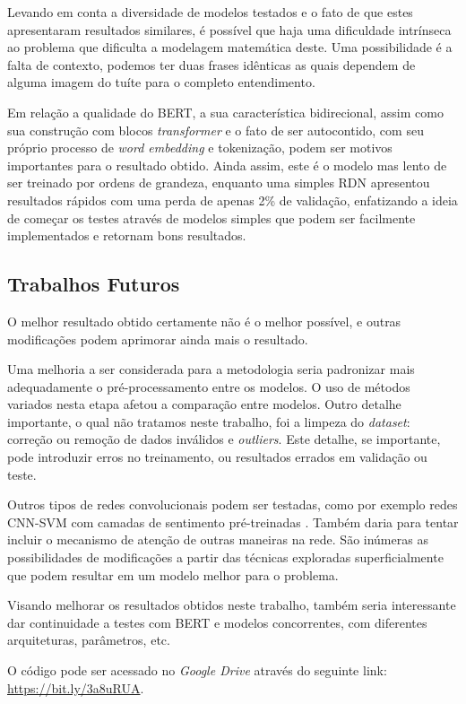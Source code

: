 \documentclass[twoside,conference,a4paper]{IEEEtran}
\begin{document}
Levando em conta a diversidade de modelos testados e o fato de que estes apresentaram resultados similares, é possível que haja uma dificuldade intrínseca ao problema que dificulta a modelagem matemática deste. Uma possibilidade é a falta de contexto, podemos ter duas frases idênticas as quais dependem de alguma imagem do tuíte para o completo entendimento.

Em relação a qualidade do BERT, a sua característica bidirecional, assim como sua construção com blocos \textit{transformer} e o fato de ser autocontido, com seu próprio processo de \textit{word embedding} e tokenização, podem ser motivos importantes para o resultado obtido. Ainda assim, este é o modelo mas lento de ser treinado por ordens de grandeza, enquanto uma simples RDN apresentou resultados rápidos com uma perda de apenas 2\% de validação, enfatizando a ideia de começar os testes através de modelos simples que podem ser facilmente implementados e retornam bons resultados.

\subsection{Trabalhos Futuros}

O melhor resultado obtido certamente não é o melhor possível, e outras modificações podem aprimorar ainda mais o resultado.

Uma melhoria a ser considerada para a metodologia seria padronizar mais adequadamente o pré-processamento entre os modelos. O uso de métodos variados nesta etapa afetou a comparação entre modelos. Outro detalhe importante, o qual não tratamos neste trabalho, foi a limpeza do \textit{dataset}: correção ou remoção de dados inválidos e \textit{outliers}. Este detalhe, se importante, pode introduzir erros no treinamento, ou resultados errados em validação ou teste.

Outros tipos de redes convolucionais podem ser testadas, como por exemplo redes CNN-SVM com camadas de sentimento pré-treinadas \cite{cnn-future}. Também daria para tentar incluir o mecanismo de atenção de outras maneiras na rede. São inúmeras as possibilidades de modificações a partir das técnicas exploradas superficialmente que podem resultar em um modelo melhor para o problema.

Visando melhorar os resultados obtidos neste trabalho, também seria interessante dar continuidade a testes com BERT e modelos concorrentes, com diferentes arquiteturas, parâmetros, etc.

O código pode ser acessado no \textit{Google Drive} através do seguinte link: \url{https://bit.ly/3a8uRUA}.







\end{document}
